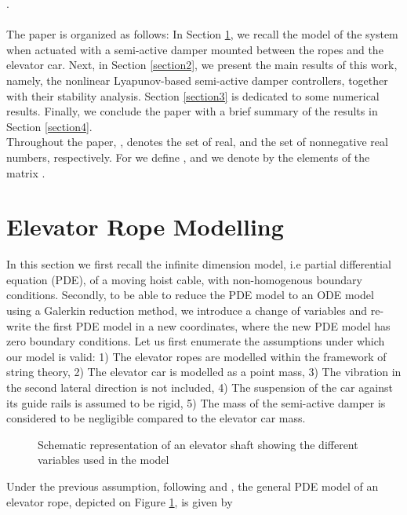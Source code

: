 \documentclass[letterpaper, 11 pt, conference]{ieeeconf}
\begin{document}
 \cite{B14}.
 \\\\The paper is organized as follows: In Section
 \ref{section1}, we recall the model of the system when actuated with a semi-active damper mounted between the ropes and the elevator car.
  Next, in Section \ref{section2}, we present the main results of this work, namely, the nonlinear
 Lyapunov-based semi-active damper controllers, together with their stability
 analysis. Section \ref{section3} is dedicated to some numerical
 results. Finally, we conclude the paper with a brief summary of the results in Section
 \ref{section4}.\\
Throughout the paper, ,  denotes the
set of real, and the set of nonnegative real numbers,
respectively. For  we define
 , and we denote by  the elements of the matrix .
\section{Elevator Rope Modelling}\label{section1} In this section we first
recall the infinite dimension model, i.e partial differential
equation (PDE), of a moving hoist cable, with non-homogenous
boundary conditions. Secondly, to be able to reduce the PDE model
to an ODE model using a Galerkin reduction method, we introduce a
change of variables and re-write the first PDE model in a new
coordinates, where the new PDE model has zero boundary conditions.
Let us first enumerate the assumptions under which our model is
valid: 1) The elevator ropes are modelled within the framework of
string theory, 2) The elevator car is modelled as a point mass, 3)
The vibration in the second lateral direction is not included, 4)
The suspension of the car against its guide rails is assumed to be
rigid, 5) The mass of the semi-active damper is considered to be
negligible compared to the elevator car mass.


\begin{figure}
\vspace{-0.5cm}
  \begin{center}
\hspace{-0.8cm}\vspace{-0.5cm}
\caption{Schematic representation of an elevator shaft showing the
different variables used in the model}


    \label{fig1}
 \end{center}
 \end{figure}
Under the previous assumption, following \cite{ZX03,K011} and
\cite{ZC06}, the general PDE model of an elevator rope, depicted
on Figure \ref{fig1}, is given by
\end{document}
